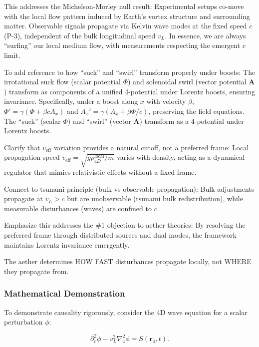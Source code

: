 This addresses the Michelson-Morley null result: Experimental setups co-move with the local flow pattern induced by Earth's vortex structure and surrounding matter. Observable signals propagate via Kelvin wave modes at the fixed speed $c$ (P-3), independent of the bulk longitudinal speed $v_L$. In essence, we are always ``surfing'' our local medium flow, with measurements respecting the emergent $c$ limit.

To add reference to how ``suck'' and ``swirl'' transform properly under boosts: The irrotational suck flow (scalar potential $\Phi$) and solenoidal swirl (vector potential $\mathbf{A}$) transform as components of a unified 4-potential under Lorentz boosts, ensuring invariance. Specifically, under a boost along $x$ with velocity $\beta$, $\Phi' = \gamma (\Phi + \beta c A_x)$ and $A_x' = \gamma (A_x + \beta \Phi / c)$, preserving the field equations. The ``suck'' (scalar $\Phi$) and ``swirl'' (vector $\mathbf{A}$) transform as a 4-potential under Lorentz boosts.

Clarify that $v_{\text{eff}}$ variation provides a natural cutoff, not a preferred frame: Local propagation speed $v_{\text{eff}} = \sqrt{g \rho_{4D}^{\text{local}} / m}$ varies with density, acting as a dynamical regulator that mimics relativistic effects without a fixed frame.

Connect to tsunami principle (bulk vs observable propagation): Bulk adjustments propagate at $v_L > c$ but are unobservable (tsunami bulk redistribution), while measurable disturbances (waves) are confined to $c$.

Emphasize this addresses the \#1 objection to aether theories: By resolving the preferred frame through distributed sources and dual modes, the framework maintains Lorentz invariance emergently.

\begin{tcolorbox}
The aether determines HOW FAST disturbances propagate locally, not WHERE they propagate from.
\end{tcolorbox}

\subsubsection{Mathematical Demonstration}

To demonstrate causality rigorously, consider the 4D wave equation for a scalar perturbation $\phi$:

\begin{equation}
\partial_t^2 \phi - v_L^2 \nabla_4^2 \phi = S(\mathbf{r}_4, t).
\end{equation}


